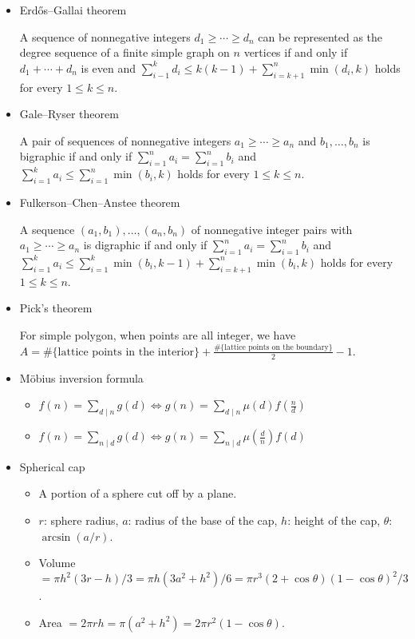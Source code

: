 \begin{itemize}
\item Erdős–Gallai theorem 

A sequence of nonnegative integers $d_1\ge\cdots\ge d_n$ can be represented as the degree sequence of a finite simple graph on $n$ vertices if and only if $d_1+\cdots+d_n$ is even and $\displaystyle\sum_{i-1}^kd_i\le k(k-1)+\displaystyle\sum_{i=k+1}^n\min(d_i,k)$ holds for every $1\le k\le n$.

\item Gale–Ryser theorem

A pair of sequences of nonnegative integers $a_1\ge\cdots\ge a_n$ and $b_1,\ldots,b_n$ is bigraphic if and only if $\displaystyle\sum_{i=1}^n a_i=\displaystyle\sum_{i=1}^n b_i$ and $\displaystyle\sum_{i=1}^k a_i\le \displaystyle\sum_{i=1}^n\min(b_i,k)$ holds for every $1\le k\le n$.

\item Fulkerson–Chen–Anstee theorem

A sequence $(a_1,b_1),\ldots,(a_n,b_n)$ of nonnegative integer pairs with $a_1\ge\cdots\ge a_n$ is digraphic if and only if $\displaystyle\sum_{i=1}^n a_i=\displaystyle\sum_{i=1}^n b_i$ and $\displaystyle\sum_{i=1}^k a_i\le \displaystyle\sum_{i=1}^k\min(b_i,k-1)+\displaystyle\sum_{i=k+1}^n\min(b_i,k)$ holds for every $1\le k\le n$.

\item Pick's theorem

For simple polygon, when points are all integer, we have $A=\text{\#\{lattice points in the interior\}} + \frac{\text{\#\{lattice points on the boundary\}}}{2} - 1$.

\item Möbius inversion formula

\begin{itemize}
  \item $f(n)=\sum_{d\mid n}g(d)\Leftrightarrow g(n)=\sum_{d\mid n}\mu(d)f(\frac{n}{d})$
  \item $f(n)=\sum_{n\mid d}g(d)\Leftrightarrow g(n)=\sum_{n\mid d}\mu(\frac{d}{n})f(d)$
\end{itemize}

\item Spherical cap

\begin{itemize}
  \item A portion of a sphere cut off by a plane.
  \item $r$: sphere radius, $a$: radius of the base of the cap, $h$: height of the cap, $\theta$: $\arcsin(a/r)$.
  \item Volume $=\pi h^2(3r-h)/3=\pi h(3a^2+h^2)/6=\pi r^3(2+\cos\theta)(1-\cos\theta)^2/3$.
  \item Area $=2\pi rh=\pi(a^2+h^2)=2\pi r^2(1-\cos\theta)$.
\end{itemize}


\end{itemize}
